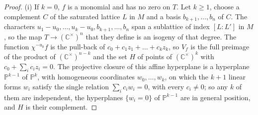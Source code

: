 \documentclass[11pt,reqno]{amsart}
\theoremstyle{plain}
\theoremstyle{definition}
\theoremstyle{remark}
\newcommand{\CC}{\mathbb{C}}
\newcommand{\PP}{\mathbb{P}}
\begin{document}
\begin{proof}
(i) If $k=0$, $f$ is a monomial and has no zero on $T$. Let $k\ge1$, choose a
complement $C$ of the saturated lattice $L$ in $M$ and a basis
$b_{k+1},\dots,b_{n}$ of $C$. The characters $u_{1}-u_{0},\dots,u_{k}-u_{0},
b_{k+1},\dots,b_{n}$ span a sublattice of index $[L:L']$ in $M$, so the map
$T\to(\CC^{\times})^{n}$ that they define is an isogeny of that degree. The
function $\chi^{-u_{0}}f$ is the pull-back of $c_{0}+c_{1}z_{1}+\dots+c_{k}
z_{k}$, so $V_{f}$ is the full preimage of the product of
$(\CC^{\times})^{n-k}$ and the set $H$ of points of $(\CC^{\times})^{k}$ with
$c_{0}+\sum_{i}c_{i}z_{i}=0$. The projective closure of this affine hyperplane is a hyperplane
$\PP^{k-1}$ of $\PP^{k}$, with homogeneous coordinates $w_{0},\dots,w_{k}$,
on which the $k+1$ linear forms $w_{i}$ satisfy the single relation
$\sum_{i}c_{i}w_{i}=0$, with every $c_{i}\ne0$; so any $k$ of them are
independent, the hyperplanes $\{w_{i}=0\}$ of $\PP^{k-1}$ are in general
position, and $H$ is their complement.


\end{proof}
\end{document}
